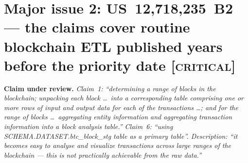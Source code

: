 \documentclass[10pt,a4paper]{article}
\newcommand{\claim}[1]{\noindent\textbf{Claim under review.} \emph{#1}\par\smallskip}
\newcommand{\sev}[1]{\textsc{\color{BrickRed}[#1]}}
\begin{document}
\section{Major issue 2: US~12,718,235~B2 --- the claims cover routine blockchain ETL published years before the priority date \sev{critical}}\label{sec:txviz}
\claim{Claim~1: ``determining a range of blocks in the blockchain; unpacking each block \ldots\ into a corresponding table comprising one or more rows of input and output data for each of the transactions \ldots; and for the range of blocks \ldots\ aggregating entity information and aggregating transaction information into a block analysis table.'' Claim~6: ``using SCHEMA.DATASET.btc\_block\_stg table as a primary table''. Description: ``it becomes easy to analyse and visualize transactions across large ranges of the blockchain --- this is not practically achievable from the raw data.''}
\end{document}
